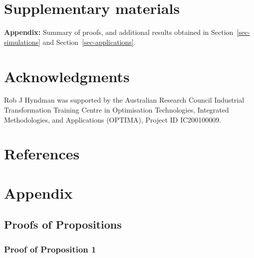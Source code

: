 \documentclass[
  11pt]{article}
\theoremstyle{plain}
\theoremstyle{remark}
\begin{document}
\section*{Supplementary materials}\label{supplementary-materials}

\textbf{Appendix:} Summary of proofs, and additional results obtained in
Section~\ref{sec-simulations} and Section~\ref{sec-applications}.

\section*{Acknowledgments}\label{acknowledgments}

Rob J Hyndman was supported by the Australian Research Council
Industrial Transformation Training Centre in Optimisation Technologies,
Integrated Methodologies, and Applications (OPTIMA), Project ID
IC200100009.

\section*{References}\label{references}

\renewcommand{\bibsection}{}


\newpage
\appendix
{}%
\setcounter{section}{0}
\renewcommand{\thesubsection}{\Alph{subsection}}
\renewcommand{\thetable}{\Alph{subsection}.\arabic{table}}
\renewcommand{\thefigure}{\Alph{subsection}.\arabic{figure}}
\setcounter{figure}{0}
\setcounter{table}{0}

\section*{Appendix}\label{appendix}

\subsection{Proofs of Propositions}\label{proofs-of-propositions}

\subsubsection{Proof of Proposition 1}\label{appendix-proofs}
\end{document}
